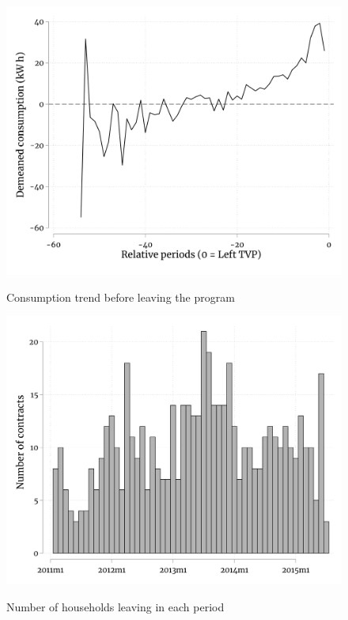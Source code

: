 
\begin{figure}[ht]
  \caption{Consumption trend before leaving the program}\label{fig:twelve}
  \begin{center}
  {\includegraphics[width=1\textwidth]{./figures/consumptionBeforeExit.png}}
  \end{center}
\end{figure}

\FloatBarrier

\begin{figure}[ht]
  \caption{Number of households leaving in each period}\label{fig:thirteen}
  \begin{center}
  {\includegraphics[width=1\textwidth]{./figures/numberLeftersPerMonth.png}}
  \end{center}
\end{figure}

